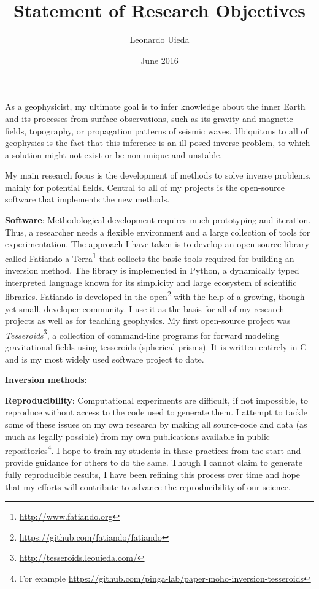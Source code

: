 \documentclass[12pt]{article}
\title{\textbf{Statement of Research Objectives}}
\author{Leonardo Uieda}
\date{June 2016}
\begin{document}
\maketitle


As a geophysicist,
my ultimate goal is
to infer knowledge about the inner Earth
and its processes
from surface observations,
such as its gravity and magnetic fields,
topography,
or propagation patterns of seismic waves.
%
Ubiquitous to all of geophysics
is the fact that this inference
is an ill-posed inverse problem,
to which a solution might not exist
or be non-unique and unstable.


My main research focus is
the development of methods
to solve inverse problems,
mainly for potential fields.
%
Central to all of my projects
is the open-source software
that implements the new methods.


\textbf{Software}:
Methodological development requires
much prototyping and iteration.
%
Thus,
a researcher needs
a flexible environment
and a large collection of tools
for experimentation.
%
The approach I have taken is
to develop an open-source library
called Fatiando a Terra\footnote{\url{http://www.fatiando.org}}
that collects the basic tools
required for building an inversion method.
%
The library is implemented in Python,
a dynamically typed interpreted language
known for its simplicity
and large ecosystem of scientific libraries.
%
Fatiando is developed in the
open\footnote{\url{https://github.com/fatiando/fatiando}}
with the help of a growing, though yet small,
developer community.
%
I use it as the basis for
all of my research projects
as well as for teaching geophysics.
%
My first open-source project
was \textit{Tesseroids}\footnote{\url{http://tesseroids.leouieda.com/}},
a collection of command-line programs
for forward modeling gravitational fields
using tesseroids (spherical prisms).
%
It is written entirely in C
and is my most widely used software project to date.


\textbf{Inversion methods}:




\textbf{Reproducibility}:
Computational experiments
are difficult, if not impossible, to reproduce
without access to the code used to generate them.
%
I attempt to tackle
some of these issues
on my own research
by making all source-code and data
(as much as legally possible)
from my own publications
available in public repositories\footnote{For example \url{https://github.com/pinga-lab/paper-moho-inversion-tesseroids}}.
%
I hope to train my students
in these practices from the start
and provide guidance for others to do the same.
%
Though I cannot claim
to generate fully reproducible results,
I have been refining this process over time
and hope that my efforts will contribute
to advance the reproducibility of our science.
\end{document}
